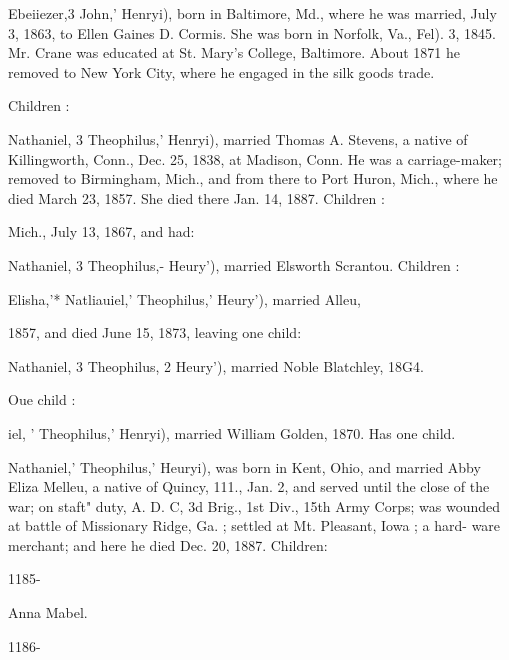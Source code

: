 \documentclass[oneside]{book}
\begin{document}
Ebeiiezer,3 John,' Henryi), born in Baltimore, Md., where he 
was married, July 3, 1863, to Ellen Gaines D. Cormis. She was 
born in Norfolk, Va., Fel). 3, 1845. Mr. Crane was educated 
at St. Mary's College, Baltimore. About 1871 he removed to 
New York City, where he engaged in the silk goods trade. 

Children : 








Nathaniel, 3 Theophilus,' Henryi), married Thomas A. Stevens, 
a native of Killingworth, Conn., Dec. 25, 1838, at Madison, 
Conn. He was a carriage-maker; removed to Birmingham, 
Mich., and from there to Port Huron, Mich., where he died 
March 23, 1857. She died there Jan. 14, 1887. Children : 






Mich., July 13, 1867, and had: 








Nathaniel, 3 Theophilus,- Heury'), married Elsworth Scrantou. 
Children : 










Elisha,'* Natliauiel,' Theophilus,' Heury'), married Alleu, 

1857, and died June 15, 1873, leaving one child: 


Nathaniel, 3 Theophilus, 2 Heury'), married Noble Blatchley, 18G4. 

Oue child : 

iel, ' Theophilus,' Henryi), married William Golden, 1870. Has 
one child. 

Nathaniel,' Theophilus,' Heuryi), was born in Kent, Ohio, and 
married Abby Eliza Melleu, a native of Quincy, 111., Jan. 2, 
and served until the close of the war; on staft" duty, A. D. C, 
3d Brig., 1st Div., 15th Army Corps; was wounded at battle of 
Missionary Ridge, Ga. ; settled at Mt. Pleasant, Iowa ; a hard- 
ware merchant; and here he died Dec. 20, 1887. Children: 



1185- 




Anna Mabel. 


1186- 
\end{document}
